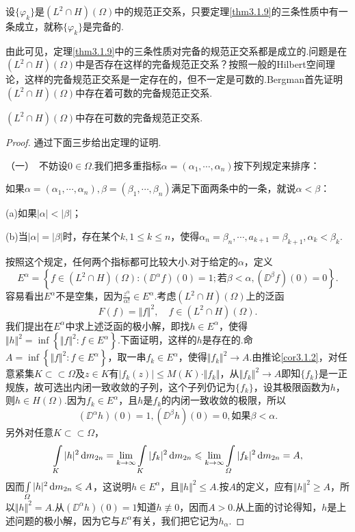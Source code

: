 \begin{definition}\label{def3.1.10}
	设$\{\varphi_k\}$是$(L^2\cap H)(\Omega)$中的规范正交系，只要定理\ref{thm3.1.9}的三条性质中有一条成立，就称$\{\varphi_k\}$是完备的.
\end{definition}
由此可见，定理\ref{thm3.1.9}中的三条性质对完备的规范正交系都是成立的.问题是在$(L^2\cap H)(\Omega)$中是否存在这样的完备规范正交系？按照一般的Hilbert空间理论，这样的完备规范正交系是一定存在的，但不一定是可数的.Bergman首先证明$(L^2\cap H)(\Omega)$中存在着可数的完备规范正交系.
\begin{theorem}\label{thm3.1.11}
	$(L^2\cap H)(\Omega)$中存在可数的完备规范正交系.
\end{theorem}
\begin{proof}
	通过下面三步给出定理的证明.
	
	（一）\hypertarget{3.1.11}{}\,
	不妨设$0\in\Omega$.我们把多重指标$\alpha=(\alpha_1,\cdots,\alpha_n)$按下列规定来排序：
	
	如果$\alpha=(\alpha_1,\cdots,\alpha_n),\beta=(\beta_1,\cdots,\beta_n)$满足下面两条中的一条，就说$\alpha<\beta$：
	
	(a)如果$|\alpha|<|\beta|$；
	
	(b)当$|\alpha|=|\beta|$时，存在某个$k,1\le k\le n$，使得$\alpha_n=\beta_n,\cdots,a_{k+1}=\beta_{k+1},\alpha_k<\beta_k$.
	
	按照这个规定，任何两个指标都可比较大小.对于给定的$\alpha$，定义
	\[E^\alpha=\left\{f\in(L^2\cap H)(\Omega)\colon(\DD^\alpha f)(0)=1;\text{若}\beta<\alpha,(\DD^\beta f)(0)=0\right\}.\]
	容易看出$E^\alpha$不是空集，因为$\frac{z^\alpha}{\alpha!}\in E^\alpha$.考虑$(L^2\cap H)(\Omega)$上的泛函
	\[F(f)=\Vert f\Vert^2,\quad f\in(L^2\cap H)(\Omega).\]
	我们提出在$E^\alpha$中求上述泛函的极小解，即找$h\in E^\alpha$，使得$\Vert h\Vert^2=\inf\left\{\Vert f\Vert^2\colon f\in E^\alpha\right\}$.下面证明，这样的$h$是存在的.命$A=\inf\left\{\Vert f\Vert^2\colon f\in E^\alpha\right\}$，取一串$f_k\in E^\alpha$，使得$\Vert f_k\Vert^2\to A$.由推论\ref{cor3.1.2}，对任意紧集$K\subset\subset\Omega$及$z\in K$有$|f_k(z)|\le M(K)\cdot\Vert f_k\Vert$，从$\Vert f_k\Vert^2\to A$即知$\{f_k\}$是一正规族，故可选出内闭一致收敛的子列，这个子列仍记为$\{f_k\}$，设其极限函数为$h$，则$h\in H(\Omega)$.因为$f_k\in E^\alpha$，且$h$是$f_k$的内闭一致收敛的极限，所以
	\[(\DD^\alpha h)(0)=1,(\DD^\beta h)(0)=0,\text{如果}\beta<\alpha.\]
	另外对任意$K\subset\subset\Omega$，
	\[\int\limits_K |h|^2\mathop{}\!\mathrm{d} m_{2n}=\lim_{k\to\infty}\int\limits_K |f_k|^2\mathop{}\!\mathrm{d} m_{2n}\leqslant\lim_{k\to\infty}\int\limits_\varOmega|f_k|^2\mathop{}\!\mathrm{d} m_{2n}=A,\]
	因而$\int\limits_\varOmega |h|^2\mathop{}\!\mathrm{d} m_{2n}\leqslant A$，这说明$h\in E^\alpha$，且$\Vert h\Vert^2\le A$.按$A$的定义，应有$\Vert h\Vert^2\ge A$，所以$\Vert h\Vert^2=A$.从$(\DD^\alpha h)(0)=1$知道$h\not\equiv0$，因而$A>0$.从上面的讨论得知，$h$是上述问题的极小解，因为它与$E^\alpha$有关，我们把它记为$h_\alpha$.
	

\end{proof}
